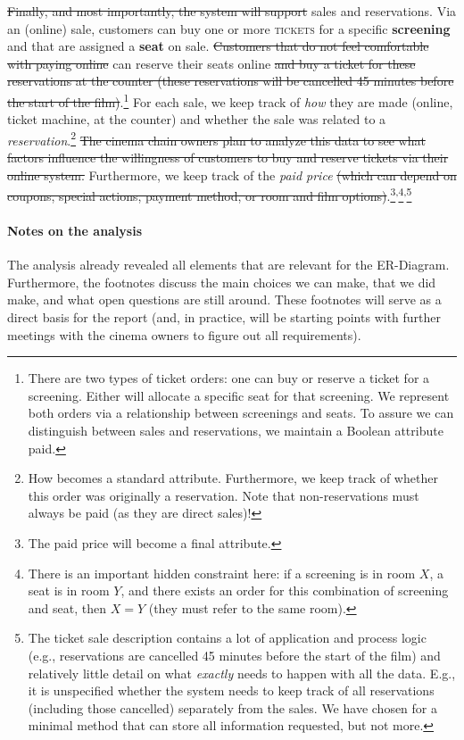 \documentclass{article}
\newcommand{\ENT}[1]{\textcolor{colA}{\textbf{#1}}}
\newcommand{\AT}[1]{\textcolor{colB}{\textit{#1}}}
\newcommand{\RS}[1]{\textcolor{colC}{\textsc{#1}}}
\newcommand{\IR}[1]{\textcolor{black!50}{\sout{#1}}}
\begin{document}
\IR{Finally, and most importantly, the system will support} sales and reservations. Via an (online) sale, customers can buy one or more \RS{tickets} for a specific \ENT{screening} and that are assigned a \ENT{seat} on sale. \IR{Customers that do not feel comfortable with paying online} can reserve their seats online \IR{and buy a ticket for these reservations at the counter (these reservations will be cancelled 45 minutes before the start of the film)}.\footnote{There are two types of ticket orders: one can buy or reserve a ticket for a screening. Either will allocate a specific seat for that screening. We represent both orders via a relationship between screenings and seats. To assure we can distinguish between sales and reservations, we maintain a Boolean attribute paid.} For each sale, we keep track of \AT{how} they are made (online, ticket machine, at the counter) and whether the sale was related to a \AT{reservation}.\footnote{How becomes a standard attribute. Furthermore, we keep track of whether this order was originally a reservation. Note that non-reservations must always be paid (as they are direct sales)!} \IR{The cinema chain owners plan to analyze this data to see what factors influence the willingness of customers to buy and reserve tickets via their online system.} Furthermore, we keep track of the \AT{paid price} \IR{(which can depend on coupons, special actions, payment method, or room and film options)}.\footnote{The paid price will become a final attribute.}\textsuperscript{,}\footnote{There is an important hidden constraint here: if a screening  is in room $X$, a seat is in room $Y$, and there exists an order for this combination of screening and seat, then $X = Y$ (they must refer to the same room).}\textsuperscript{,}\footnote{The ticket sale description contains a lot of application and process logic (e.g., reservations are cancelled 45 minutes before the start of the film) and relatively little detail on what \emph{exactly} needs to happen with all the data. E.g., it is unspecified whether the system needs to keep track of all reservations (including those cancelled) separately from the sales. We have chosen for a minimal method that can store all information requested, but not more.}

\paragraph{Notes on the analysis}

The analysis already revealed all elements that are relevant for the ER-Diagram. Furthermore, the footnotes discuss the main choices we can make, that we did make, and what open questions are still around. These footnotes will serve as a direct basis for the report (and, in practice, will be starting points with further meetings with the cinema owners to figure out all requirements).
\end{document}

